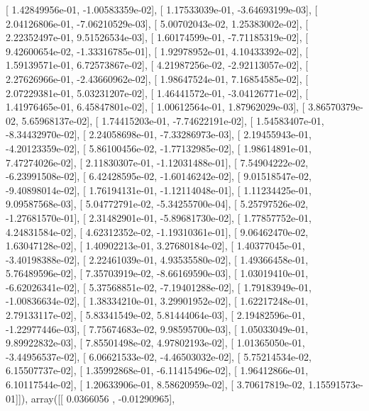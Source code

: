 \documentclass{article}
\begin{document}
       [  1.42849956e-01,  -1.00583359e-02],
       [  1.17533039e-01,  -3.64693199e-03],
       [  2.04126806e-01,  -7.06210529e-03],
       [  5.00702043e-02,   1.25383002e-02],
       [  2.22352497e-01,   9.51526534e-03],
       [  1.60174599e-01,  -7.71185319e-02],
       [  9.42600654e-02,  -1.33316785e-01],
       [  1.92978952e-01,   4.10433392e-02],
       [  1.59139571e-01,   6.72573867e-02],
       [  4.21987256e-02,  -2.92113057e-02],
       [  2.27626966e-01,  -2.43660962e-02],
       [  1.98647524e-01,   7.16854585e-02],
       [  2.07229381e-01,   5.03231207e-02],
       [  1.46441572e-01,  -3.04126771e-02],
       [  1.41976465e-01,   6.45847801e-02],
       [  1.00612564e-01,   1.87962029e-03],
       [  3.86570379e-02,   5.65968137e-02],
       [  1.74415203e-01,  -7.74622191e-02],
       [  1.54583407e-01,  -8.34432970e-02],
       [  2.24058698e-01,  -7.33286973e-03],
       [  2.19455943e-01,  -4.20123359e-02],
       [  5.86100456e-02,  -1.77132985e-02],
       [  1.98614891e-01,   7.47274026e-02],
       [  2.11830307e-01,  -1.12031488e-01],
       [  7.54904222e-02,  -6.23991508e-02],
       [  6.42428595e-02,  -1.60146242e-02],
       [  9.01518547e-02,  -9.40898014e-02],
       [  1.76194131e-01,  -1.12114048e-01],
       [  1.11234425e-01,   9.09587568e-03],
       [  5.04772791e-02,  -5.34255700e-04],
       [  5.25797526e-02,  -1.27681570e-01],
       [  2.31482901e-01,  -5.89681730e-02],
       [  1.77857752e-01,   4.24831584e-02],
       [  4.62312352e-02,  -1.19310361e-01],
       [  9.06462470e-02,   1.63047128e-02],
       [  1.40902213e-01,   3.27680184e-02],
       [  1.40377045e-01,  -3.40198388e-02],
       [  2.22461039e-01,   4.93535580e-02],
       [  1.49366458e-01,   5.76489596e-02],
       [  7.35703919e-02,  -8.66169590e-03],
       [  1.03019410e-01,  -6.62026341e-02],
       [  5.37568851e-02,  -7.19401288e-02],
       [  1.79183949e-01,  -1.00836634e-02],
       [  1.38334210e-01,   3.29901952e-02],
       [  1.62217248e-01,   2.79133117e-02],
       [  5.83341549e-02,   5.81444064e-03],
       [  2.19482596e-01,  -1.22977446e-03],
       [  7.75674683e-02,   9.98595700e-03],
       [  1.05033049e-01,   9.89922832e-03],
       [  7.85501498e-02,   4.97802193e-02],
       [  1.01365050e-01,  -3.44956537e-02],
       [  6.06621533e-02,  -4.46503032e-02],
       [  5.75214534e-02,   6.15507737e-02],
       [  1.35992868e-01,  -6.11415496e-02],
       [  1.96412866e-01,   6.10117544e-02],
       [  1.20633906e-01,   8.58620959e-02],
       [  3.70617819e-02,   1.15591573e-01]]), array([[ 0.0366056 , -0.01290965],
\end{document}
